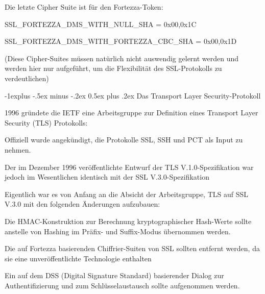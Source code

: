 \documentclass[a4paper]{article}
\makeatletter
\renewcommand{\subsection}{\@startsection{subsection}{2}{0mm}%
 {-1explus -.5ex minus -.2ex}%
 {0.5ex plus .2ex}%
 {\normalfont\normalsize\bfseries}}
\makeatother
\begin{document}
\begin{multicols}{3}
\begin{itemize*}
\begin{itemize*}
                  \item Die letzte Cipher Suite ist für den Fortezza-Token:
                  \begin{itemize*}
                        \item SSL\_FORTEZZA\_DMS\_WITH\_NULL\_SHA = { 0x00,0x1C }
                        \item SSL\_FORTEZZA\_DMS\_WITH\_FORTEZZA\_CBC\_SHA = { 0x00,0x1D }
                  \end{itemize*}
            \end{itemize*}
            (Diese Cipher-Suites müssen natürlich nicht auswendig gelernt werden und
            werden hier nur aufgeführt, um die Flexibilität des SSL-Protokolls zu
            verdeutlichen)

            \subsection{Das Transport Layer
                  Security-Protokoll}
            \begin{itemize*}
                  \item 1996 gründete die IETF eine Arbeitsgruppe zur Definition eines
                  Transport Layer Security (TLS) Protokolls:
                  \begin{itemize*}
                        \item Offiziell wurde angekündigt, die Protokolle SSL, SSH und PCT als Input zu nehmen.
                        \item Der im Dezember 1996 veröffentlichte Entwurf der TLS V.1.0-Spezifikation war jedoch im Wesentlichen identisch mit der SSL V.3.0-Spezifikation
                  \end{itemize*}
                  \item Eigentlich war es von Anfang an die Absicht der Arbeitsgruppe, TLS auf
                  SSL V.3.0 mit den folgenden Änderungen aufzubauen:
                  \begin{itemize*}
                        \item Die HMAC-Konstruktion zur Berechnung kryptographischer Hash-Werte sollte anstelle von Hashing im Präfix- und Suffix-Modus übernommen werden.
                        \item Die auf Fortezza basierenden Chiffrier-Suiten von SSL sollten entfernt werden, da sie eine unveröffentlichte Technologie enthalten
                        \item Ein auf dem DSS (Digital Signature Standard) basierender Dialog zur Authentifizierung und zum Schlüsselaustausch sollte aufgenommen werden.

\end{itemize*}
\end{itemize*}
\end{itemize*}
\end{multicols}
\end{document}

